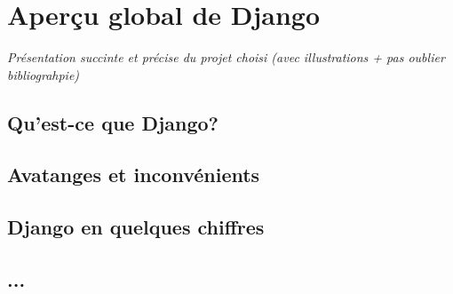 \chapter{Aperçu global de Django}

\textcolor{dkblue}{\textit{Présentation succinte et précise du projet choisi (avec illustrations + pas oublier bibliograhpie)}}

\section{Qu'est-ce que Django?}




\section{Avatanges et inconvénients}




\section{Django en quelques chiffres}


\section{...}
